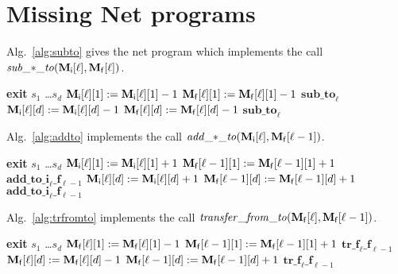\documentclass{fsttcs}
\def\addto{\mathit{add\_\mathord{\ast}\_to}}
\def\subto{\mathit{sub\_\mathord{\ast}\_to}}
\begin{document}
\begin{spacing}{0.9}


\end{spacing}



\newpage
\appendix


\section{Missing Net programs}
Alg.~\ref{alg:subto} gives the net program which implements the call \(\subto(\mathbf{M_{\sf i}}[\ell],\mathbf{M_{\sf f}}[\ell])\).

\begin{algorithm}[H]
	\goto \textbf{exit} \Kor \(s_1\) \Kor \ldots \Kor \(s_d\) \;
	\(\mathbf{M}_{\sf i}[\ell][1]:=\mathbf{M}_{\sf i}[\ell][1]-1\)\;
	\(\mathbf{M}_{\sf f}[\ell][1]:=\mathbf{M}_{\sf f}[\ell][1]-1\)\;
	\goto \textbf{\(\mathbf{sub\_to}_{\ell}\)}\;
	[\ldots]\;
	\(\mathbf{M}_{\sf i}[\ell][d]:=\mathbf{M}_{\sf i}[\ell][d]-1\)\;
	\(\mathbf{M}_{\sf f}[\ell][d]:=\mathbf{M}_{\sf f}[\ell][d]-1\)\;
	\goto \(\mathbf{sub\_to}_{\ell}\)\;
	 \Return{}\;
	\caption{\label{alg:subto}}
\end{algorithm}
Alg.~\ref{alg:addto} implements the call \(\addto(\mathbf{M_{\sf i}}[\ell],\mathbf{M_{\sf f}}[\ell-1])\).

\begin{algorithm}[H]
\goto \textbf{exit} \Kor \(s_1\) \Kor \ldots \Kor \(s_d\) \;
	\(\mathbf{M}_{\sf i}[\ell][1]:=\mathbf{M}_{\sf i}[\ell][1]+1\)\;
	\(\mathbf{M}_{\sf f}[\ell-1][1]:=\mathbf{M}_{\sf f}[\ell-1][1]+1\)\;
	\goto \(\mathbf{add\_to\_i}_{\ell}\_\mathbf{f}_{\ell-1}\)\;
	[\ldots]\;
	\(\mathbf{M}_{\sf i}[\ell][d]:=\mathbf{M}_{\sf i}[\ell][d]+1\)\;
	\(\mathbf{M}_{\sf f}[\ell-1][d]:=\mathbf{M}_{\sf f}[\ell-1][d]+1\)\;
	\goto \(\mathbf{add\_to\_i}_{\ell}\_\mathbf{f}_{\ell-1}\)\;
	 \Return{}\;
	\caption{\label{alg:addto}}
\end{algorithm}
Alg.~\ref{alg:trfromto} implements the call \(\mathit{transfer\_from\_to}(\mathbf{M_{\sf f}}[\ell],\mathbf{M_{\sf f}}[\ell-1])\).

\begin{algorithm}[H]
\goto \textbf{exit} \Kor \(s_1\) \Kor \ldots \Kor \(s_d\) \;
	 \(\mathbf{M}_{\sf f}[\ell][1]:=\mathbf{M}_{\sf f}[\ell][1]-1\)\;
	\(\mathbf{M}_{\sf f}[\ell-1][1]:=\mathbf{M}_{\sf f}[\ell-1][1]+1\)\;
	\goto \(\mathbf{tr\_f}_{\ell}\mathbf{\_f}_{\ell-1}\)\;
	[\ldots]\;
	\(\mathbf{M}_{\sf f}[\ell][d]:=\mathbf{M}_{\sf f}[\ell][d]-1\)\;
	\(\mathbf{M}_{\sf f}[\ell-1][d]:=\mathbf{M}_{\sf f}[\ell-1][d]+1\)\;
	\goto \(\mathbf{tr\_f}_{\ell}\mathbf{\_f}_{\ell-1}\)\;
	 \Return{}\;
	\caption{\label{alg:trfromto}}
\end{algorithm}
\end{document}
